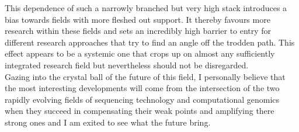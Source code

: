 \documentclass[conference]{IEEEtran}
\begin{document}
This dependence of such a narrowly branched but very high stack introduces a bias towards fields with more fleshed out support. It thereby favours more research within these fields and sets an incredibly high barrier to entry for different research approaches that try to find an angle off the trodden path. This effect appears to be a systemic one that crops up on almost any sufficiently integrated research field but nevertheless should not be disregarded. \\
Gazing into the crystal ball of the future of this field, I personally believe that the most interesting developments will come from the intersection of the two rapidly evolving fields of sequencing technology and computational genomics when they succeed in compensating their weak points and amplifying there strong ones and I am exited to see what the future bring. 



%


\end{document}
